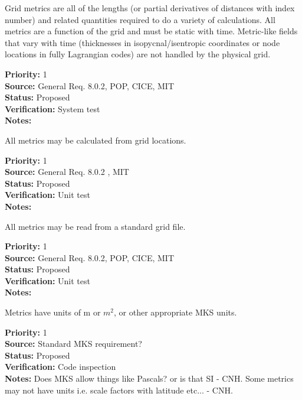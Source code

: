 Grid metrics are all of the lengths (or partial derivatives of distances with
index number) and related quantities required to do a variety of calculations. 
All metrics are a function of the grid and must be static with time.  Metric-like
fields that vary with time (thicknesses in isopycnal/isentropic coordinates
or node locations in fully Lagrangian codes) are not handled by the physical grid.
\begin{reqlist}
{\bf Priority:} 1 \\
{\bf Source:} General Req. 8.0.2, POP, CICE, MIT \\
{\bf Status:} Proposed \\
{\bf Verification:} System test\\
{\bf Notes:} 
\end{reqlist}

All metrics may be calculated from grid locations.
\begin{reqlist}
{\bf Priority:} 1 \\
{\bf Source:} General Req. 8.0.2 , MIT\\
{\bf Status:} Proposed \\
{\bf Verification:} Unit test\\
{\bf Notes:} 
\end{reqlist}

All metrics may be read from a standard grid file.
\begin{reqlist}
{\bf Priority:} 1 \\
{\bf Source:} General Req. 8.0.2, POP, CICE, MIT \\
{\bf Status:} Proposed \\
{\bf Verification:} Unit test\\
{\bf Notes:} 
\end{reqlist}

Metrics have units of m or $m^2$, or other appropriate MKS units.
\begin{reqlist}
{\bf Priority:} 1 \\
{\bf Source:} Standard MKS requirement? \\
{\bf Status:} Proposed \\
{\bf Verification:} Code inspection \\
{\bf Notes:} Does MKS allow things like Pascals? or is that SI - CNH.
Some metrics may not have units i.e. scale factors with latitude etc... - CNH.
\end{reqlist}

